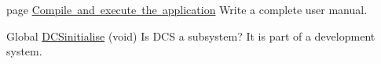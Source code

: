 
\begin{DoxyRefList}
\item[page \mbox{\hyperlink{index}{Compile and execute the application}} ]\label{todo__todo000002}%
%
Write a complete user manual. 
\item[Global \mbox{\hyperlink{dev_console_8h_ac9a2e9db3d4bc066ae53f35251ba3635}{DCSinitialise}} (void)]\label{todo__todo000001}%
%
Is DCS a subsystem? It is part of a development system. 
\end{DoxyRefList}